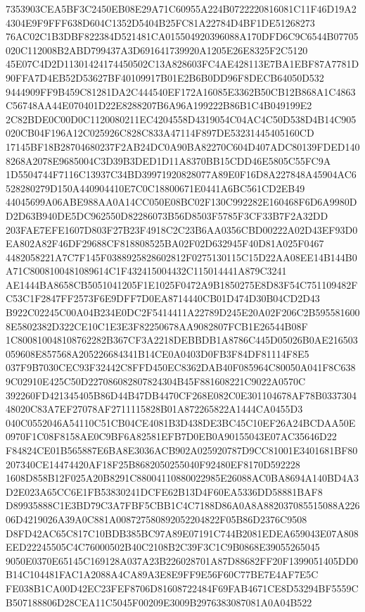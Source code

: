 \documentclass[UTF8,fontset=fandol,zihao=-4,a4paper]{ctexart}
\begin{document}
{{7353903CEA5BF3C2450EB08E29A71C60955A224B0722220816081C11F46D19A24304E9F9FFF638D604C1352D5404B25FC81A22784D4BF1DE51268273
76AC02C1B3DBF822384D521481CA015504920396088A170DFD6C9C6544B07705020C112008B2ABD799437A3D691641739920A1205E26E8325F2C5120
45E07C4D2D11301424174450502C13A828603FC4AE428113E7BA1EBF87A7781D90FFA7D4EB52D53627BF40109917B01E2B6B0DD96F8DECB64050D532
9444909FF9B459C81281DA2C444540EF172A16085E3362B50CB12B868A1C4863C56748AA44E070401D22E8288207B6A96A199222B86B1C4B049199E2
2C82BDE0C00D0C1120080211EC4204558D4319054C04AC4C50D538D4B14C905020CB04F196A12C025926C828C833A47114F897DE53231445405160CD
17145BF18B28704680237F2AB24DC0A90BA82270C604D407ADC80139FDED1408268A2078E9685004C3D39B3DED1D11A8370BB15CDD46E5805C55FC9A
1D5504744F7116C13937C34BD39971920828077A89E0F16D8A227848A45904AC6528280279D150A440904410E7C0C18800671E0441A6BC561CD2EB49
44045699A06ABE988AA0A14CC050E08BC02F130C992282E160468F6D6A9980DD2D63B940DE5DC962550D82286073B56D8503F5785F3CF33B7F2A32DD
203FAE7EFE1607D803F27B23F4918C2C23B6AA0356CBD00222A02D43EF93D0EA802A82F46DF29688CF818808525BA02F02D632945F40D81A025F0467
4482058221A7C7F145F0388925828602812F0275130115C15D22AA08EE14B144B0A71C8008100481089614C1F432415004432C115014441A879C3241
AE1444BA8658CB5051041205F1E1025F0472A9B1850275E8D83F54C751109482FC53C1F2847FF2573F6E9DFF7D0EA8714440CB01D474D30B04CD2D43
B922C02245C00A04B234E0DC2F5414411A22789D245E20A02F206C2B5955816008E5802382D322CE10C1E3E3F82250678AA9082807FCB1E26544B08F
1C800810048108762282B367CF3A2218DEBBDB1A8786C445D05026B0AE216503059608E857568A205226684341B14CE0A0403D0FB3F84DF81114F8E5
037F9B7030CEC93F32442C8FFD450EC8362DAB40F085964C80050A041F8C6389C02910E425C50D227086082807824304B45F881608221C9022A0570C
392260FD421345405B86D44B47DB4470CF268E082C0E301104678AF78B033730448020C83A7EF27078AF2711115828B01A872265822A1444CA0455D3
040C0552046A54110C51CB04CE4081B3D438DE3BC45C10EF26A24BCDAA50E0970F1C08F8158AE0C9BF6A82581EFB7D0EB0A90155043E07AC35646D22
F84824CE01B565887E6BA8E3036ACB902A025920787D9CC81001E3401681BF80207340CE14474420AF18F25B8682050255040F92480EF8170D592228
1608D858B12F025A20B8291C88004110880022985E26088AC0BA8694A140BD4A3D2E023A65CC6E1FB53830241DCFE62B13D4F60EA5336DD58881BAF8
D89935888C1E3BD79C3A7FBF5CBB1C4C7188D86A0A8A882037085515088A22606D4219026A39A0C881A008727580892052204822F05B86D2376C9508
D8FD42AC65C817C10BDB385BC97A89E07191C744B2081EDEA659043E07A808EED22245505C4C76000502B40C2108B2C39F3C1C9B0868E39055265045
9050E0370E65145C169128A037A23B226028701A87D88682FF20F1399051405DD0B14C104481FAC1A2088A4CA89A3E8E9FF9E56F60C77BE7E4AF7E5C
FE038B1CA00D42EC23FEF8706D81608722484F69FAB4671CE8D53294BF5559CB507188806D28CEA11C5045F00209E3009B2976383087081A0A04B522
}}
\end{document}
